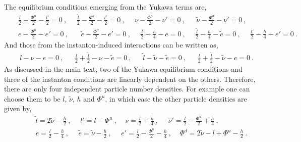 \documentclass[prd,showpcs,amsmath,amssymb,nofootinbib,preprintnumbers,balancelastpage,longbibliography,superscriptaddress,notitlepage]{revtex4}
\def\bea{\begin{eqnarray}}
\def\eea{\end{eqnarray}}
\def\bea{\begin{eqnarray}}
\def\eea{\end{eqnarray}}
\begin{document}
The equilibrium conditions emerging from the Yukawa terms are,
\bea
&&\frac{l}{2} - \frac{\Phi^u}{2} - \frac{l'}{2} = 0 \ , \ \ \ \ \ \ \frac{\tilde{l}}{2} - \frac{\Phi^d}{2} - \frac{l'}{2} = 0  \ , \ \ \ \ \ \   \nu - \frac{\Phi^u}{2} - \nu' = 0 \ , \ \ \ \ \ \ \  \tilde{\nu} - \frac{\Phi^d}{2} - \nu' = 0 \ , \nonumber\\
&& e - \frac{\Phi^u}{2} - e' = 0 \ , \ \ \ \ \ \ \  \ \tilde{e} - \frac{\Phi^d}{2} - e' = 0 \ , \ \ \ \ \ \  \frac{l}{2} - \frac{h}{4} - e = 0 \ , \ \ \ \ \ \ \frac{\tilde{l}}{2} - \frac{h}{4} - \tilde{e} = 0  \ , \ \ \ \ \ \  \frac{l'}{2} - \frac{h}{4} - e' = 0 \ .
\eea
And those from the instanton-induced interactions can be written as,
\bea
&&l - \nu - e = 0 \ , \ \ \ \ \ \ \ \frac{l}{2} +\frac{\tilde{l}}{2} - \nu - \tilde{e} = 0 \  , \ \ \ \ \ \ \  \tilde{l} - \tilde{\nu} - \tilde{e} = 0 \ , \ \ \ \ \ \ \ \frac{l}{2} + \frac{\tilde{l}}{2} - \tilde{\nu} - {e} = 0 \ .
\eea
As discussed in the main text, two of the Yukawa equilibrium conditions and three of the instanton conditions are linearly dependent on the others. 
Therefore, there are only four independent particle number densities. For example one can choose them to be $l$, $\tilde{\nu}$, $h$ and $\Phi^u$, in which case the other particle densities are given by,
\bea
&& \ \ \ \ \ \ \tilde{l}= 2\tilde{\nu} - \frac{h}{2} \ , \ \ \ \ \, \  l'= l - \Phi^u \ , \ \ \  \ \   \nu = \frac{l}{2} + \frac{h}{4} \ ,  \ \ \ \ \ \ \nu'= \frac{l}{2} - \frac{\Phi^u}{2} + \frac{h}{4} \ , \nonumber\\
&&\ \ \ \ \ \  e = \frac{l}{2}  - \frac{h}{4} \ , \ \ \ \ \ \  \tilde{e}= \tilde{\nu}- \frac{h}{2} \ ,  \ \ \ \ \ \ e' = \frac{l}{2} - \frac{\Phi^u}{2} - \frac{h}{4} \ , \ \ \ \   \ \Phi^d = 2\tilde{\nu} - l + \Phi^u - \frac{h}{2} \ .
\eea






\end{document}
